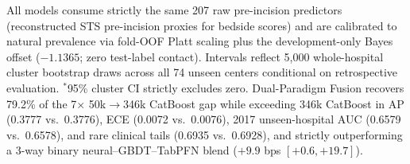 \begin{table}[t]
All models consume strictly the same 207 raw pre-incision predictors (reconstructed STS pre-incision proxies for bedside scores) and are calibrated to natural prevalence via fold-OOF Platt scaling plus the development-only Bayes offset ($-1.1365$; zero test-label contact). Intervals reflect 5,000 whole-hospital cluster bootstrap draws across all 74 unseen centers conditional on retrospective evaluation. $^{\ast}$95\% cluster CI strictly excludes zero. Dual-Paradigm Fusion recovers 79.2\% of the 7$\times$ 50k$\to$346k CatBoost gap while exceeding 346k CatBoost in AP (0.3777 vs.\ 0.3776), ECE (0.0072 vs.\ 0.0076), 2017 unseen-hospital AUC (0.6579 vs.\ 0.6578), and rare clinical tails (0.6935 vs.\ 0.6928), and strictly outperforming a 3-way binary neural--GBDT--TabPFN blend ($+9.9$ bps $[+0.6, +19.7]$).
\end{table}
